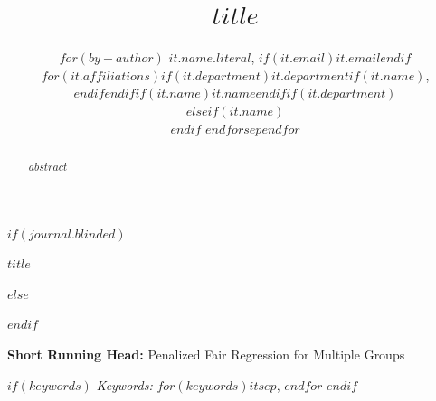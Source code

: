 

\def\spacingset#1{\renewcommand{\baselinestretch}%
{#1}\small\normalsize} \spacingset{1}



$if(journal.blinded)$
\spacingset{.8}
\bigskip
\bigskip
\bigskip
\begin{center}
  {\LARGE\bf $title$}
\end{center}
\smallskip
\bigskip
\spacingset{1}
$else$
\title{\bf $title$}
\author{
$for(by-author)$
$it.name.literal$, $if(it.email)$$it.email$$endif$\\
$for(it.affiliations)$$if(it.department)$$it.department$$if(it.name)$,\\ $endif$$endif$$if(it.name)$$it.name$$endif$$if(it.department)$\\$elseif(it.name)$\\$endif$
$endfor$$sep$$endfor$}
\maketitle
$endif$

\bigskip
\begin{center}
\textbf{Short Running Head:} Penalized Fair Regression for Multiple Groups
\end{center}

\bigskip
\begin{abstract}
$abstract$
\end{abstract}

$if(keywords)$
\noindent%
{\it Keywords:} $for(keywords)$$it$$sep$, $endfor$
\vfill
$endif$

\newpage
\spacingset{1.9} %

